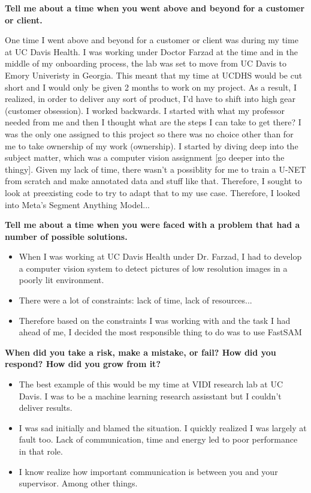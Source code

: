 \documentclass{article}
\begin{document}
\textbf{Tell me about a time when you went above and beyond for a customer or client.}

One time I went above and beyond for a customer or client was during my time at UC Davis Health. I was working under Doctor Farzad at the time and in the middle of my onboarding process, the lab was set to move from UC Davis to Emory Univeristy in Georgia. This meant that my time at UCDHS would be cut short and I would only be given 2 months to work on my project. As a result, I realized, in order to deliver any sort of product, I'd have to shift into high gear (customer obsession). I worked backwards. I started with what my professor needed from me and then I thought what are the steps I can take to get there? I was the only one assigned to this project so there was no choice other than for me to take ownership of my work (ownership). I started by diving deep into the subject matter, which was a computer vision assignment [go deeper into the thingy]. Given my lack of time, there wasn't a possiblity for me to train a U-NET from scratch and make annotated data and stuff like that. Therefore, I sought to look at preexisting code to try to adapt that to my use case. Therefore, I looked into Meta's Segment Anything Model... \newline

\textbf{Tell me about a time when you were faced with a problem that had a number of possible solutions.}
\begin{itemize}
\item When I was working at UC Davis Health under Dr. Farzad, I had to develop a computer vision system to detect pictures of low resolution images in a poorly lit environment.
\item There were a lot of constraints: lack of time, lack of resources...
\item Therefore based on the constraints I was working with and the task I had ahead of me, I decided the most responsible thing to do was to use FastSAM
\end{itemize} \newline

\textbf{When did you take a risk, make a mistake, or fail? How did you respond? How did you grow from it?}
\begin{itemize}
\item The best example of this would be my time at VIDI research lab at UC Davis. I was to be a machine learning research assisstant but I couldn't deliver results.
\item I was sad initially and blamed the situation. I quickly realized I was largely at fault too. Lack of communication, time and energy led to poor performance in that role.
\item I know realize how important communication is between you and your supervisor. Among other things.
\end{itemize} \newline
 
\end{document}
